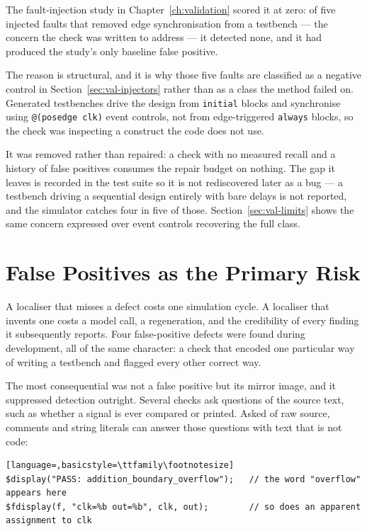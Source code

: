\documentclass[11pt,a4paper,titlepage=false]{scrreprt}
\begin{document}
The fault-injection study in Chapter~\ref{ch:validation} scored it at zero: of five injected
faults that removed edge synchronisation from a testbench --- the concern the check was
written to address --- it detected none, and it had produced the study's only baseline false
positive.

The reason is structural, and it is why those five faults are classified as a negative
control in Section~\ref{sec:val-injectors} rather than as a class the method failed on.
Generated testbenches drive the design from \texttt{initial} blocks and synchronise using
\texttt{@(posedge clk)} event controls, not from edge-triggered \texttt{always} blocks, so
the check was inspecting a construct the code does not use.

It was removed rather than repaired: a check with no measured recall and a history of false
positives consumes the repair budget on nothing. The gap it leaves is recorded in the test
suite so it is not rediscovered later as a bug --- a testbench driving a sequential design
entirely with bare delays is not reported, and the simulator catches four in five of those.
Section~\ref{sec:val-limits} shows the same concern expressed over event controls recovering
the full class.

\section{False Positives as the Primary Risk}\label{sec:loc-falsepos}

A localiser that misses a defect costs one simulation cycle. A localiser that invents one
costs a model call, a regeneration, and the credibility of every finding it subsequently
reports. Four false-positive defects were found during development, all of the same
character: a check that encoded one particular way of writing a testbench and flagged every
other correct way.

The most consequential was not a false positive but its mirror image, and it suppressed
detection outright. Several checks ask questions of the source text, such as whether a
signal is ever compared or printed. Asked of raw source, comments and string literals can
answer those questions with text that is not code:

\begin{lstlisting}[language=,basicstyle=\ttfamily\footnotesize]
$display("PASS: addition_boundary_overflow");   // the word "overflow" appears here
$fdisplay(f, "clk=%b out=%b", clk, out);        // so does an apparent assignment to clk
\end{lstlisting}
\end{document}
